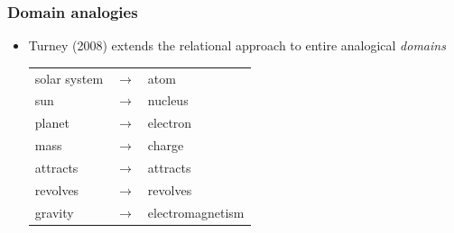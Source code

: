 \begin{frame}
  \frametitle{Domain analogies}

  \begin{itemize}
  \item Turney (2008) extends the relational approach to entire
    analogical \emph{domains}
    \begin{center}
      \begin{tabular}{lll}
        solar system&$\rightarrow$& atom \\
        sun&$\rightarrow$& nucleus \\
        planet&$\rightarrow$& electron \\
        mass&$\rightarrow$& charge \\
        attracts&$\rightarrow$& attracts \\
        revolves&$\rightarrow$& revolves \\
        gravity&$\rightarrow$& electromagnetism \\
      \end{tabular}
    \end{center}
\end{itemize}
\end{frame}





